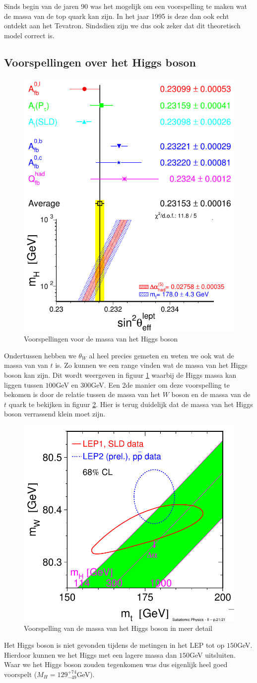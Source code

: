 \documentclass[../main.tex]{subfiles}
\begin{document}
Sinds begin van de jaren 90 was het mogelijk om een voorspelling te maken wat de massa van de top quark kan zijn. In het jaar 1995 is deze dan ook echt ontdekt aan het Tevatron. Sindsdien zijn we dus ook zeker dat dit theoretisch model correct is.

\subsection{Voorspellingen over het Higgs boson}%
\label{sub:voorspellingen_over_het_higgs_boson}

\begin{figure}[h]
    \centering
    \includegraphics[width=0.5\linewidth]{elektroweak_precision_tests/h_massa_voorspelling.png}
    \caption{Voorspellingen voor de massa van het Higgs boson}%
    \label{fig:elektroweak_precision_tests/h_massa_voorspelling}
\end{figure}
Ondertussen hebben we $\theta_W$ al heel precies gemeten en weten we ook wat de massa van van $t$ is. Zo kunnen we een range vinden wat de massa van het Higgs boson kan zijn. Dit wordt weergeven in figuur \ref{fig:elektroweak_precision_tests/h_massa_voorspelling} waarbij de Higgs massa kan liggen tussen $100$GeV en $300$GeV. Een 2de manier om deze voorspelling te bekomen is door de relatie tussen de massa van het $W$ boson en de massa van de $t$ quark te bekijken in figuur \ref{fig:elektroweak_precision_tests/h_massa_voorspelling_2}. Hier is terug duidelijk dat de massa van het Higgs boson verrassend klein moet zijn.

\begin{figure}[h]
    \centering
    \includegraphics[width=0.4\linewidth]{elektroweak_precision_tests/h_massa_voorspelling_2.png}
    \caption{Voorspelling van de massa van het Higgs boson in meer detail}%
    \label{fig:elektroweak_precision_tests/h_massa_voorspelling_2}
\end{figure}

Het Higgs boson is niet gevonden tijdens de metingen in het LEP tot op $150$GeV. Hierdoor kunnen we het Higgs met een lagere massa dan $150$GeV uitsluiten. Waar we het Higgs boson zouden tegenkomen was dus eigenlijk heel goed voorspelt ($M_H = 129_{-49}^{+74}$GeV).
\end{document}
